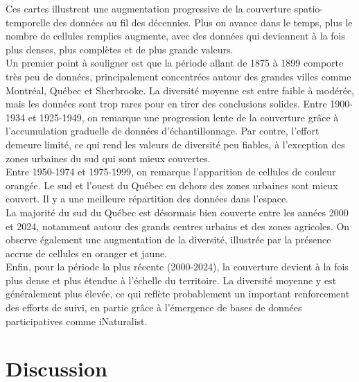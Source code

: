 \documentclass[9pt,twocolumn,twoside,]{pnas-new}
\begin{document}
Ces cartes illustrent une augmentation progressive de la couverture
spatio-temporelle des données au fil des décennies. Plus on avance dans
le temps, plus le nombre de cellules remplies augmente, avec des données
qui deviennent à la fois plus denses, plus complètes et de plus grande
valeurs.\\
Un premier point à souligner est que la période allant de 1875 à 1899
comporte très peu de données, principalement concentrées autour des
grandes villes comme Montréal, Québec et Sherbrooke. La diversité
moyenne est entre faible à modérée, mais les données sont trop rares
pour en tirer des conclusions solides. Entre 1900-1934 et 1925-1949, on
remarque une progression lente de la couverture grâce à l'accumulation
graduelle de données d'échantillonnage. Par contre, l'effort demeure
limité, ce qui rend les valeurs de diversité peu fiables, à l'exception
des zones urbaines du sud qui sont mieux couvertes.\\
Entre 1950-1974 et 1975-1999, on remarque l'apparition de cellules de
couleur orangée. Le sud et l'ouest du Québec en dehors des zones
urbaines sont mieux couvert. Il y a une meilleure répartition des
données dans l'espace.\\
La majorité du sud du Québec est désormais bien couverte entre les
années 2000 et 2024, notamment autour des grands centres urbains et des
zones agricoles. On observe également une augmentation de la diversité,
illustrée par la présence accrue de cellules en oranger et jaune.\\
Enfin, pour la période la plus récente (2000-2024), la couverture
devient à la fois plus dense et plus étendue à l'échelle du territoire.
La diversité moyenne y est généralement plus élevée, ce qui reflète
probablement un important renforcement des efforts de suivi, en partie
grâce à l'émergence de bases de données participatives comme
iNaturalist.

\section{Discussion}\label{discussion}
\end{document}
